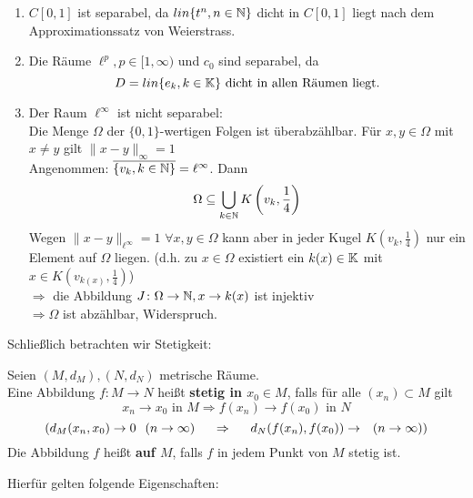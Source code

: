 \begin{beispiel}
\begin{enumerate}[label=\alph*\upshape)]
		\item $C[0, 1]$ ist separabel, da $ lin \{ t^{n}, n \in \mathbb{N} \} $ dicht in $C[0, 1]$ liegt nach dem Approximationssatz von Weierstrass.
		\item Die Räume $\ell^{p}, p \in [1, \infty)$ und $c_{0}$ sind separabel, da
			\[ D = lin \{ e_{k}, k \in \mathbb{K} \} \text{ dicht in allen Räumen liegt.} \]
		\item Der Raum $\ell^{\infty}$ ist nicht separabel: \\
			Die Menge $\Omega$ der $\{0, 1\}$-wertigen Folgen ist überabzählbar. Für $x, y \in \Omega$ mit $x \neq y$ gilt $\| x - y \|_{\infty} = 1$ \\
			Angenommen: $\overline{ \{v_{k}, k \in \mathbb{N} \} } = \ell^{\infty}$. Dann
			\[ \Omega \subseteq \bigcup_{k \in \mathbb{N}} K \left( v_{k}, \frac{1}{4} \right) \]
			Wegen $\| x - y\|_{\ell^{\infty}} = 1$ $\forall x, y \in \Omega$ kann aber in jeder Kugel $K(v_{k}, \frac{1}{4})$ nur ein Element auf $\Omega$ liegen. 
			(d.h. zu $x \in \Omega$ existiert ein $k(x) \in \mathbb{K}$ mit $x \in K(v_{k(x)}, \frac{1}{4})$) \\
			$\Rightarrow$ die Abbildung $ J \colon \Omega \rightarrow \mathbb{N}, x \rightarrow k(x)$ ist injektiv \\
			$\Rightarrow \Omega$ ist abzählbar, Widerspruch.
	\end{enumerate}
\end{beispiel}


Schlie{\ss}lich betrachten wir Stetigkeit:


\begin{definition}
	Seien $(M, d_{M}), (N, d_{N})$ metrische Räume. \\
	Eine Abbildung $f \colon M \rightarrow N$ hei{\ss}t \textbf{stetig in $x_{0} \in M$}, falls für alle $(x_{n}) \subset M$ gilt
	\[ x_{n} \rightarrow x_{0} \text{ in } M \Rightarrow f(x_{n}) \rightarrow f(x_{0}) \text{ in } N \]
	\[ (d_{M}(x_{n}, x_{0}) \rightarrow 0 \hspace{0.25cm} (n \rightarrow \infty) \hspace{0.5cm} \Rightarrow \hspace{0.5cm} d_{N}(f(x_{n}), f(x_{0})) \rightarrow \hspace{0.25cm} (n \rightarrow \infty)) \]
	Die Abbildung $f$ hei{\ss}t  \textbf{auf $M$}, falls $f$ in jedem Punkt von $M$ stetig ist.
\end{definition}


Hierfür gelten folgende Eigenschaften:


